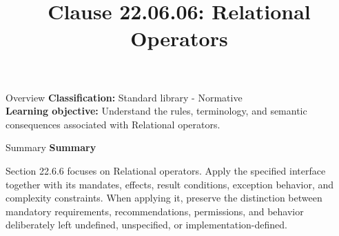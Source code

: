\documentclass[10pt,letterpaper]{article}
\title{Clause 22.06.06: Relational Operators}
\author{}
\date{}
\begin{document}
\maketitle
\begin{CornellOverviewBox}{Overview}
\textbf{Classification:} Standard library - Normative\\[2pt]
\textbf{Learning objective:} Understand the rules, terminology, and semantic consequences associated with Relational operators.
\end{CornellOverviewBox}\begin{CornellSummaryBox}{Summary}
{\sffamily\bfseries\color{Accent} Summary}\par\vspace{3pt}Section 22.6.6 focuses on Relational operators. Apply the specified interface together with its mandates, effects, result conditions, exception behavior, and complexity constraints. When applying it, preserve the distinction between mandatory requirements, recommendations, permissions, and behavior deliberately left undefined, unspecified, or implementation-defined.
\end{CornellSummaryBox}
\end{document}
